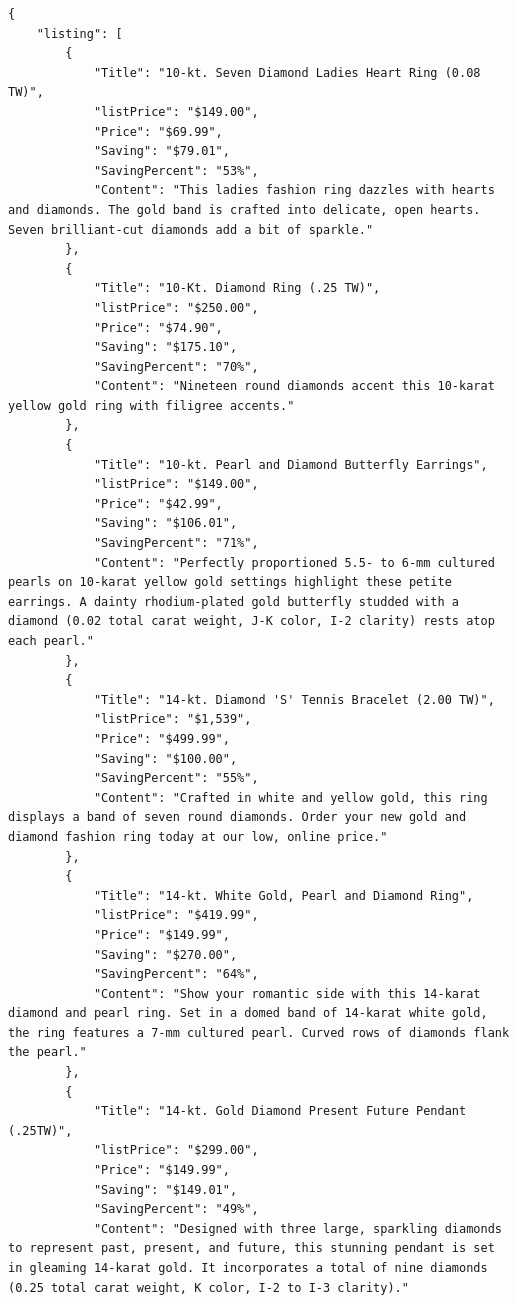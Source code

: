 \documentclass[runningheads]{llncs}
\begin{document}
\begin{lstlisting}[caption={Results for jewlary website},captionpos=b, label={lst:label2}]
{
    "listing": [
        {
            "Title": "10-kt. Seven Diamond Ladies Heart Ring (0.08 TW)",
            "listPrice": "$149.00",
            "Price": "$69.99",
            "Saving": "$79.01",
            "SavingPercent": "53%",
            "Content": "This ladies fashion ring dazzles with hearts and diamonds. The gold band is crafted into delicate, open hearts. Seven brilliant-cut diamonds add a bit of sparkle."
        },
        {
            "Title": "10-Kt. Diamond Ring (.25 TW)",
            "listPrice": "$250.00",
            "Price": "$74.90",
            "Saving": "$175.10",
            "SavingPercent": "70%",
            "Content": "Nineteen round diamonds accent this 10-karat yellow gold ring with filigree accents."
        },
        {
            "Title": "10-kt. Pearl and Diamond Butterfly Earrings",
            "listPrice": "$149.00",
            "Price": "$42.99",
            "Saving": "$106.01",
            "SavingPercent": "71%",
            "Content": "Perfectly proportioned 5.5- to 6-mm cultured pearls on 10-karat yellow gold settings highlight these petite earrings. A dainty rhodium-plated gold butterfly studded with a diamond (0.02 total carat weight, J-K color, I-2 clarity) rests atop each pearl."
        },
        {
            "Title": "14-kt. Diamond 'S' Tennis Bracelet (2.00 TW)",
            "listPrice": "$1,539",
            "Price": "$499.99",
            "Saving": "$100.00",
            "SavingPercent": "55%",
            "Content": "Crafted in white and yellow gold, this ring displays a band of seven round diamonds. Order your new gold and diamond fashion ring today at our low, online price."
        },
        {
            "Title": "14-kt. White Gold, Pearl and Diamond Ring",
            "listPrice": "$419.99",
            "Price": "$149.99",
            "Saving": "$270.00",
            "SavingPercent": "64%",
            "Content": "Show your romantic side with this 14-karat diamond and pearl ring. Set in a domed band of 14-karat white gold, the ring features a 7-mm cultured pearl. Curved rows of diamonds flank the pearl."
        },
        {
            "Title": "14-kt. Gold Diamond Present Future Pendant (.25TW)",
            "listPrice": "$299.00",
            "Price": "$149.99",
            "Saving": "$149.01",
            "SavingPercent": "49%",
            "Content": "Designed with three large, sparkling diamonds to represent past, present, and future, this stunning pendant is set in gleaming 14-karat gold. It incorporates a total of nine diamonds (0.25 total carat weight, K color, I-2 to I-3 clarity)."

\end{lstlisting}
\end{document}
